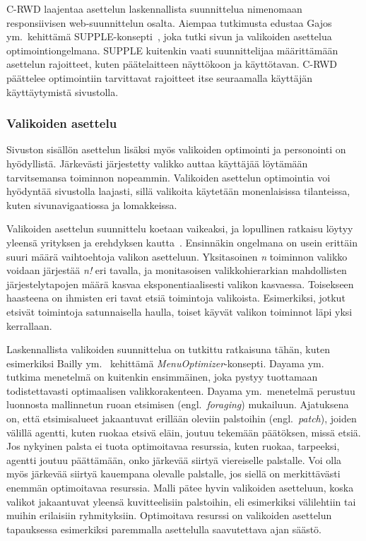 \documentclass[finnish, 12pt, a4paper, elec, utf8, a-1b, online]{aaltothesis}
\begin{document}
C-RWD laajentaa asettelun laskennallista suunnittelua nimenomaan responsiivisen
web-suunnittelun osalta. Aiempaa tutkimusta edustaa Gajos ym.~kehittämä
SUPPLE-konsepti~\cite{10.1145/964442.964461}, joka tutki sivun ja valikoiden
asettelua optimointiongelmana. SUPPLE kuitenkin vaati suunnittelijaa
määrittämään asettelun rajoitteet, kuten päätelaitteen näyttökoon ja
käyttötavan. C-RWD päättelee optimointiin tarvittavat rajoitteet itse
seuraamalla käyttäjän käyttäytymistä sivustolla.

\subsubsection{Valikoiden asettelu}

Sivuston sisällön asettelun lisäksi myös valikoiden optimointi ja personointi on
hyödyllistä. Järkevästi järjestetty valikko auttaa käyttäjää löytämään
tarvitsemansa toiminnon nopeammin. Valikoiden asettelun optimointia voi
hyödyntää sivustolla laajasti, sillä valikoita käytetään monenlaisissa
tilanteissa, kuten sivunavigaatiossa ja lomakkeissa.

Valikoiden asettelun suunnittelu koetaan vaikeaksi, ja lopullinen ratkaisu
löytyy yleensä yrityksen ja erehdyksen kautta~\cite{10.1145/2501988.2502024}.
Ensinnäkin ongelmana on usein erittäin suuri määrä vaihtoehtoja valikon
asetteluun. Yksitasoinen \textit{n} toiminnon valikko voidaan järjestää
\textit{n!} eri tavalla, ja monitasoisen valikkohierarkian mahdollisten
järjestelytapojen määrä kasvaa eksponentiaalisesti valikon kasvaessa. Toisekseen
haasteena on ihmisten eri tavat etsiä toimintoja valikoista. Esimerkiksi, jotkut
etsivät toimintoja satunnaisella haulla, toiset käyvät valikon toiminnot läpi
yksi kerrallaan.

Laskennallista valikoiden suunnittelua on tutkittu ratkaisuna tähän, kuten
esimerkiksi Bailly ym.~\cite{10.1145/2501988.2502024} kehittämä
\textit{MenuOptimizer}-konsepti. Dayama ym.~\cite{DAYAMA2021102624} tutkima
menetelmä on kuitenkin ensimmäinen, joka pystyy tuottamaan todistettavasti
optimaalisen valikkorakenteen. Dayama ym.~menetelmä perustuu luonnosta
mallinnetun ruoan etsimisen (engl.~\textit{foraging}) mukailuun. Ajatuksena on,
että etsimisalueet jakaantuvat erillään oleviin palstoihin
(engl.~\textit{patch}), joiden välillä agentti, kuten ruokaa etsivä eläin,
joutuu tekemään päätöksen, missä etsiä. Jos nykyinen palsta ei tuota
optimoitavaa resurssia, kuten ruokaa, tarpeeksi, agentti joutuu päättämään, onko
järkevää siirtyä viereiselle palstalle. Voi olla myös järkevää siirtyä kauempana
olevalle palstalle, jos siellä on merkittävästi enemmän optimoitavaa resurssia.
Malli pätee hyvin valikoiden asetteluun, koska valikot jakaantuvat yleensä
kuvitteelisiin palstoihin, eli esimerkiksi välilehtiin tai muihin erilaisiin
ryhmityksiin. Optimoitava resurssi on valikoiden asettelun tapauksessa
esimerkiksi paremmalla asettelulla saavutettava ajan säästö.
\end{document}
